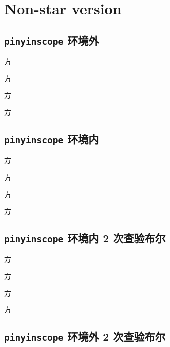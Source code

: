 \documentclass[twocolumn]{article}
\begin{document}
\section{Non-star version}

\subsection{\texttt{pinyinscope} 环境外}

\enablepinyin

方

方

\disablepinyin

方

方

\subsection{\texttt{pinyinscope} 环境内}

\begin{pinyinscope}

方

方

\disablepinyin

方

方

\end{pinyinscope}

\subsection{\texttt{pinyinscope} 环境内 2 次查验布尔}

\begin{pinyinscope}

方

方

\disablepinyin

方

方

\end{pinyinscope}

\subsection{\texttt{pinyinscope} 环境外 2 次查验布尔}

\enablepinyin
\end{document}
